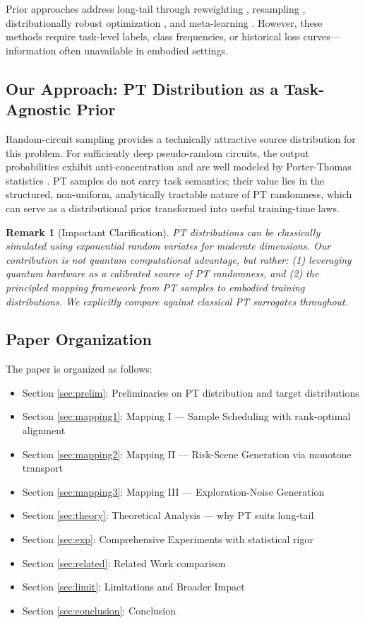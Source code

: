 \documentclass[11pt, a4paper, oneside]{article}
\theoremstyle{plain}
\theoremstyle{break}
\theoremstyle{plain}
\theoremstyle{breakdef}
\theoremstyle{plain}
\theoremstyle{breakrem}
\newtheorem*{rem}{Remark}
\theoremstyle{plain}
\theoremstyle{breakrem}
\newtheorem*{rem}{Remark}
\begin{document}
Prior approaches address long-tail through reweighting \cite{lin2017focal,menon2021longtail}, resampling \cite{chawla2002smote}, distributionally robust optimization \cite{sinha2018certifiable}, and meta-learning \cite{shu2019metaweight}. However, these methods require task-level labels, class frequencies, or historical loss curves---information often unavailable in embodied settings.

\subsection{Our Approach: PT Distribution as a Task-Agnostic Prior}
\label{sec:approach}

Random-circuit sampling provides a technically attractive source distribution for this problem. For sufficiently deep pseudo-random circuits, the output probabilities exhibit anti-concentration and are well modeled by Porter-Thomas statistics \cite{arute2019quantum,boixo2017characterizing}. PT samples do not carry task semantics; their value lies in the structured, non-uniform, analytically tractable nature of PT randomness, which can serve as a distributional prior transformed into useful training-time laws.

\begin{rem}[Important Clarification]
PT distributions can be classically simulated using exponential random variates for moderate dimensions. Our contribution is not quantum computational advantage, but rather: (1) leveraging quantum hardware as a calibrated source of PT randomness, and (2) the principled mapping framework from PT samples to embodied training distributions. We explicitly compare against classical PT surrogates throughout.
\end{rem}

\subsection{Paper Organization}
\label{sec:org}

The paper is organized as follows:
\begin{itemize}
    \item Section \ref{sec:prelim}: Preliminaries on PT distribution and target distributions
    \item Section \ref{sec:mapping1}: Mapping I --- Sample Scheduling with rank-optimal alignment
    \item Section \ref{sec:mapping2}: Mapping II --- Risk-Scene Generation via monotone transport
    \item Section \ref{sec:mapping3}: Mapping III --- Exploration-Noise Generation
    \item Section \ref{sec:theory}: Theoretical Analysis --- why PT suits long-tail
    \item Section \ref{sec:exp}: Comprehensive Experiments with statistical rigor
    \item Section \ref{sec:related}: Related Work comparison
    \item Section \ref{sec:limit}: Limitations and Broader Impact
    \item Section \ref{sec:conclusion}: Conclusion
\end{itemize}
\end{document}
